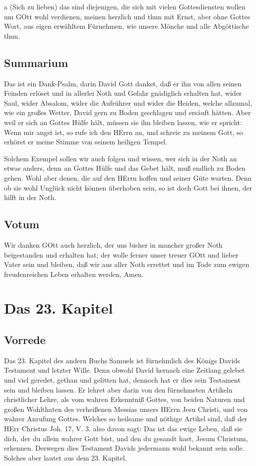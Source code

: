a (Sich zu lieben) das sind diejenigen, die sich mit vielen Gottesdiensten wollen um GOtt wohl verdienen, meinen herzlich und thun mit Ernst, aber ohne Gottes Wort, aus eigen erwähltem Fürnehmen, wie unsere Mönche und alle Abgöttische thun.

\section{Summarium}

Das ist ein Dank-Psalm, darin David Gott danket, daß er ihn von allen seinen Feinden erlöset und in allerlei Noth und Gefahr gnädiglich erhalten hat, wider Saul, wider Absalom, wider die Aufrührer und wider die Heiden, welche allzumal, wie ein großes Wetter, David gern zu Boden geschlagen und ersäuft hätten. Aber weil er sich an Gottes Hülfe hält, müssen sie ihn bleiben lassen, wie er spricht: Wenn mir angst ist, so rufe ich den HErrn an, und schreie zu meinem Gott, so erhöret er meine Stimme von seinem heiligen Tempel.

Solchem Exempel sollen wir auch folgen und wissen, wer sich in der Noth an etwas anders, denn an Gottes Hülfe und das Gebet hält, muß endlich zu Boden gehen. Wohl aber denen, die auf den HErrn hoffen und seiner Güte warten. Denn ob sie wohl Unglück nicht können überhoben sein, so ist doch Gott bei ihnen, der hilft in der Noth.

\section{Votum}

Wir danken GOtt auch herzlich, der uns bisher in mancher großer Noth beigestanden und erhalten hat; der wolle ferner unser treuer GOtt und lieber Vater sein und bleiben, daß wir aus aller Noth errettet und im Tode zum ewigen freudenreichen Leben erhalten werden, Amen.

\chapter{Das 23. Kapitel}

\section{Vorrede}

Das 23. Kapitel des andern Buchs Samuels ist fürnehmlich des Königs Davids Testament und letzter Wille. Denn obwohl David hernach eine Zeitlang gelebet und viel geredet, gethan und gelitten hat, dennoch hat er dies sein Testament sein und bleiben lassen. Er lehret aber darin von den fürnehmsten Artikeln christlicher Lehre, als vom wahren Erkenntniß Gottes, von beiden Naturen und großen Wohlthaten des verheißenen Messias unsers HErrn Jesu Christi, und von wahrer Anrufung Gottes. Welches so heilsame und nöthige Artikel sind, daß der HErr Christus Joh. 17, V. 3. also davon sagt: Das ist das ewige Leben, daß sie dich, der du allein wahrer Gott bist, und den du gesandt hast, Jesum Christum, erkennen. Derwegen dies Testament Davids jedermann wohl bekannt sein solle. Solches aber lautet aus dem 23. Kapitel.

